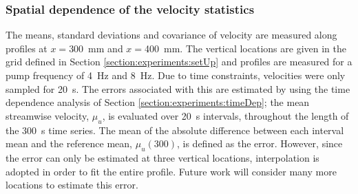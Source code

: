\documentclass[12pt,oneside,a4paper]{article}
\begin{document}
\subsubsection{Spatial dependence of the velocity statistics}
The means, standard deviations and covariance of velocity are measured along profiles at $x=$\SI{300}{mm} and $x=$\SI{400}{mm}. The vertical locations are given in the grid defined in Section \ref{section:experiments:setUp} and profiles are measured for a pump frequency of \SI{4}{Hz} and \SI{8}{Hz}. Due to time constraints, velocities were only sampled for \SI{20}{s}. The errors associated with this are estimated by using the time dependence analysis of Section \ref{section:experiments:timeDep}; the mean streamwise velocity, $\mu_u$, is evaluated over \SI{20}{s} intervals, throughout the length of the \SI{300}{s} time series. The mean of the absolute difference between each interval mean and the reference mean, $\mu_u(300)$, is defined as the error. However, since the error can only be estimated at three vertical locations, interpolation is adopted in order to fit the entire profile. Future work will consider many more locations to estimate this error. 
\end{document}
